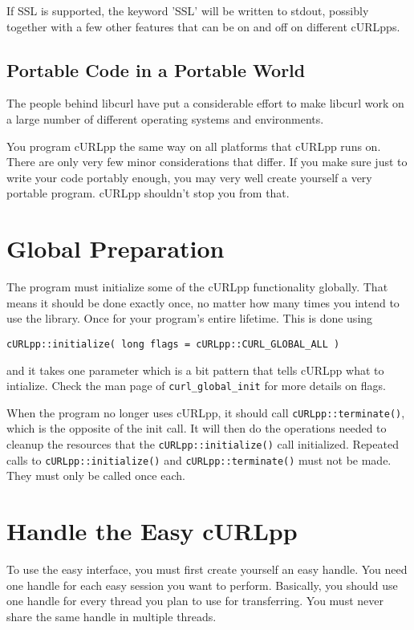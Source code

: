 \documentclass{article}
\begin{document}
If SSL is supported, the keyword 'SSL' will be written to stdout,
possibly together with a few other features that can be on and off on
different cURLpps.


\subsection{Portable Code in a Portable World}

The people behind libcurl have put a considerable effort to make libcurl work
on a large number of different operating systems and environments.

You program cURLpp the same way on all platforms that cURLpp runs on. There
are only very few minor considerations that differ. If you make sure just to
write your code portably enough, you may very well create yourself a very
portable program. cURLpp shouldn't stop you from that.

\section{Global Preparation}

The program must initialize some of the cURLpp functionality globally. That
means it should be done exactly once, no matter how many times you intend to
use the library. Once for your program's entire lifetime. This is done using

\begin{verbatim} 
cURLpp::initialize( long flags = cURLpp::CURL_GLOBAL_ALL ) 
\end{verbatim}

and it takes one parameter which is a bit pattern that tells cURLpp what to
intialize. Check the man page of \verb+curl_global_init+ for more details on flags.

When the program no longer uses cURLpp, it should call \verb+cURLpp::terminate()+, 
which is the opposite of the init call. It will then do the operations needed 
to cleanup the resources that the \verb+cURLpp::initialize()+ call initialized. 
Repeated calls to \verb+cURLpp::initialize()+ and \verb+cURLpp::terminate()+ must not be made. 
They must only be called once each.

\section{Handle the Easy cURLpp}

To use the easy interface, you must first create yourself an easy handle. You
need one handle for each easy session you want to perform. Basically, you
should use one handle for every thread you plan to use for transferring. You
must never share the same handle in multiple threads.
\end{document}
